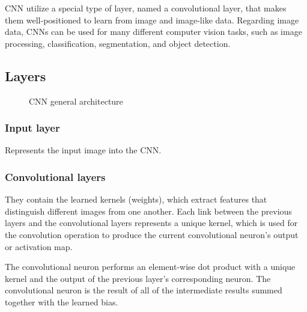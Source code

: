 \documentclass[
  13pt,
  a4paper,
  DIV=11,
  numbers=noendperiod]{scrreprt}
\begin{document}
CNN utilize a special type of layer, named a convolutional layer, that
makes them well-positioned to learn from image and image-like data.
Regarding image data, CNNs can be used for many different computer
vision tasks, such as image processing, classification, segmentation,
and object detection.

\subsection{Layers}\label{layers}

\begin{figure}


\caption{\label{fig-cnn}CNN general architecture}

\end{figure}%

\subsubsection{Input layer}\label{input-layer}

Represents the input image into the CNN.

\subsubsection{Convolutional layers}\label{convolutional-layers}

They contain the learned kernels (weights), which extract features that
distinguish different images from one another. Each link between the
previous layers and the convolutional layers represents a unique kernel,
which is used for the convolution operation to produce the current
convolutional neuron's output or activation map.

The convolutional neuron performs an element-wise dot product with a
unique kernel and the output of the previous layer's corresponding
neuron. The convolutional neuron is the result of all of the
intermediate results summed together with the learned bias.
\end{document}
